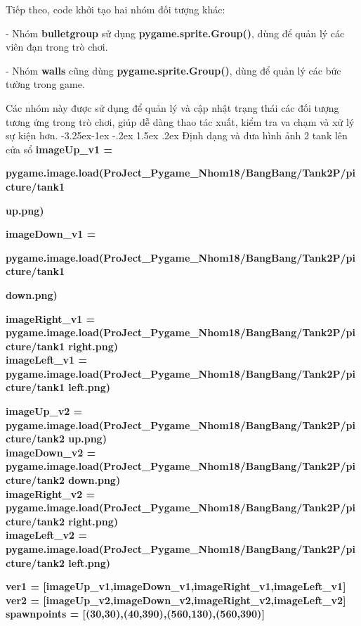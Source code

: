 \documentclass[a4paper]{article}
\makeatletter
\newcounter {subsubsubsection}[subsubsection]
\newcommand\subsubsubsection{\@startsection{subsubsubsection}{4}{\z@}%
                                     {-3.25ex\@plus -1ex \@minus -.2ex}%
                                     {1.5ex \@plus .2ex}%
                                     {\normalfont\normalsize\bfseries}}
\makeatother
\begin{document}
Tiếp theo, code khởi tạo hai nhóm đối tượng khác:

- Nhóm \textbf{bulletgroup} sử dụng \textbf{pygame.sprite.Group()}, dùng
để quản lý các viên đạn trong trò chơi.

- Nhóm \textbf{walls} cũng dùng \textbf{pygame.sprite.Group()}, dùng để
quản lý các bức tường trong game.

Các nhóm này được sử dụng để quản lý và cập nhật trạng thái các đối
tượng tương ứng trong trò chơi, giúp dễ dàng thao tác xuất, kiểm tra va chạm
và xử lý sự kiện hơn.
\subsubsubsection{Định dạng và đưa hình ảnh 2 tank lên cửa sổ}
\textbf{imageUp\_v1 =}

\textbf{pygame.image.load(\textquotesingle ProJect\_Pygame\_Nhom18/BangBang/Tank2P/picture/tank1}

\textbf{up.png\textquotesingle)}

\textbf{imageDown\_v1 =}

\textbf{pygame.image.load(\textquotesingle ProJect\_Pygame\_Nhom18/BangBang/Tank2P/picture/tank1}

\textbf{down.png\textquotesingle)}

\textbf{imageRight\_v1 =}\\
\textbf{pygame.image.load(\textquotesingle ProJect\_Pygame\_Nhom18/BangBang/Tank2P/picture/tank1
right.png\textquotesingle)}\\
\textbf{imageLeft\_v1 =}\\
\textbf{pygame.image.load(\textquotesingle ProJect\_Pygame\_Nhom18/BangBang/Tank2P/picture/tank1
left.png\textquotesingle)}

\textbf{imageUp\_v2 =}\\
\textbf{pygame.image.load(\textquotesingle ProJect\_Pygame\_Nhom18/BangBang/Tank2P/picture/tank2
up.png\textquotesingle)}\\
\textbf{imageDown\_v2 =}\\
\textbf{pygame.image.load(\textquotesingle ProJect\_Pygame\_Nhom18/BangBang/Tank2P/picture/tank2
down.png\textquotesingle)}\\
\textbf{imageRight\_v2 =}\\
\textbf{pygame.image.load(\textquotesingle ProJect\_Pygame\_Nhom18/BangBang/Tank2P/picture/tank2
right.png\textquotesingle)}\\
\textbf{imageLeft\_v2 =}\\
\textbf{pygame.image.load(\textquotesingle ProJect\_Pygame\_Nhom18/BangBang/Tank2P/picture/tank2
left.png\textquotesingle)}

\textbf{ver1 =
{[}imageUp\_v1,imageDown\_v1,imageRight\_v1,imageLeft\_v1{]} ver2 =
{[}imageUp\_v2,imageDown\_v2,imageRight\_v2,imageLeft\_v2{]} spawnpoints
= {[}(30,30),(40,390),(560,130),(560,390){]}}
\end{document}
